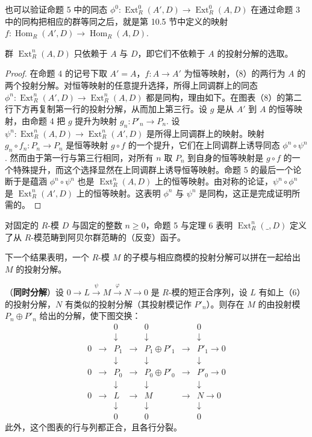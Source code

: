 也可以验证命题 5 中的同态 \(\phi^0 : \operatorname{Ext}_R^0(A', D) \to \operatorname{Ext}_R^0(A, D)\) 在通过命题 3 中的同构把相应的群等同之后，就是第 10.5 节中定义的映射 \(f : \operatorname{Hom}_R(A', D) \to \operatorname{Hom}_R(A, D)\).

\begin{theorem}\label{thm:17.6}
群 \(\operatorname{Ext}_R^n(A, D)\) 只依赖于 \(A\) 与 \(D\)，即它们不依赖于 \(A\) 的投射分解的选取。
\end{theorem}

\begin{proof}
在命题 4 的记号下取 \(A' = A\)，\(f : A \to A'\) 为恒等映射，（8）的两行为 \(A\) 的两个投射分解。对恒等映射的任意提升选择，所得上同调群上的同态 \(\phi^n : \operatorname{Ext}_R^n(A', D) \to \operatorname{Ext}_R^n(A, D)\) 都是同构，理由如下。在图表（8）的第二行下方再复制第一行的投射分解，从而加上第三行。设 \(g\) 是从 \(A'\) 到 \(A\) 的恒等映射，由命题 4 把 \(g\) 提升为映射 \(g_n : P'_n \to P_n\). 设 \(\psi^n : \operatorname{Ext}_R^n(A, D) \to \operatorname{Ext}_R^n(A', D)\) 是所得上同调群上的映射。映射 \(g_n \circ f_n : P_n \to P_n\) 是恒等映射 \(g \circ f\) 的一个提升，它们在上同调群上诱导同态 \(\phi^n \circ \psi^n\). 然而由于第一行与第三行相同，对所有 \(n\) 取 \(P_n\) 到自身的恒等映射是 \(g \circ f\) 的一个特殊提升，而这个选择显然在上同调群上诱导恒等映射。命题 5 的最后一个论断于是蕴涵 \(\phi^n \circ \psi^n\) 也是 \(\operatorname{Ext}_R^n(A, D)\) 上的恒等映射。由对称的论证，\(\psi^n \circ \phi^n\) 是 \(\operatorname{Ext}_R^n(A', D)\) 上的恒等映射。这表明 \(\phi^n\) 与 \(\psi^n\) 是同构，这正是完成证明所需的。
\end{proof}

对固定的 \(R\)-模 \(D\) 与固定的整数 \(n \geq 0\)，命题 5 与定理 6 表明 \(\operatorname{Ext}_R^n(\_, D)\) 定义了从 \(R\)-模范畴到阿贝尔群范畴的（反变）函子。

下一个结果表明，一个 \(R\)-模 \(M\) 的子模与相应商模的投射分解可以拼在一起给出 \(M\) 的投射分解。

\begin{proposition}\label{pro:17.7}
（\textbf{同时分解}）设 \(0 \to L \xrightarrow{\psi} M \xrightarrow{\varphi} N \to 0\) 是 \(R\)-模的短正合序列，设 \(L\) 有如上（6）的投射分解，\(N\) 有类似的投射分解（其投射模记作 \(P'_n\)）。则存在 \(M\) 的由投射模 \(P_n \oplus P'_n\) 给出的分解，使下图交换：
\[
\begin{array}{ccccccc}
& & 0 & & 0 & & 0\\
& & \downarrow & & \downarrow & & \downarrow\\
0 & \to & P_1 & \to & P_1 \oplus P'_1 & \to & P'_1 \to 0\\
& & \downarrow & & \downarrow & & \downarrow\\
0 & \to & P_0 & \to & P_0 \oplus P'_0 & \to & P'_0 \to 0\\
& & \downarrow & & \downarrow & & \downarrow\\
0 & \to & L & \to & M & \to & N \to 0\\
& & \downarrow & & \downarrow & & \downarrow\\
& & 0 & & 0 & & 0
\end{array} \tag{17.11}
\]
此外，这个图表的行与列都正合，且各行分裂。
\end{proposition}


